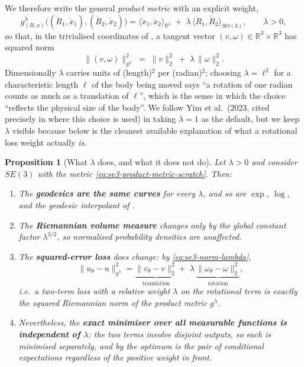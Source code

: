 \documentclass[11pt,a4paper]{report}
\newtheorem{proposition}[proposition]{Proposition}
\theoremstyle{definition}
\theoremstyle{remark}
\newcommand{\RR}{\mathbb R}
\begin{document}
We therefore write the general \emph{product metric} with an explicit
weight,
\begin{equation}
\label{eq:se3-product-metric-scratch}
g^\lambda_{(R,x)}\bigl((\dot R_1,\dot x_1),(\dot R_2,\dot x_2)\bigr)
=
\langle\dot x_1,\dot x_2\rangle_{\RR^3}
\;+\;
\lambda\,\langle\dot R_1,\dot R_2\rangle_{SO(3)} ,
\qquad \lambda>0 ,
\end{equation}
so that, in the trivialised coordinates of
, a tangent vector $(v,\omega)\in\RR^3\times\RR^3$
has squared norm
\begin{equation}
\label{eq:se3-norm-lambda}
\bigl\|(v,\omega)\bigr\|_{g^\lambda}^2 \;=\; \|v\|_2^2 \;+\; \lambda\,\|\omega\|_2^2 .
\end{equation}
Dimensionally $\lambda$ carries units of (length)$^2$ per (radian)$^2$;
choosing $\lambda=\ell^2$ for a characteristic length $\ell$ of the body
being moved says ``a rotation of one radian counts as much as a translation
of $\ell$'', which is the sense in which the choice ``reflects the physical
size of the body''. We follow Yim et al.\ (2023, cited precisely in
 where this choice is used) in taking $\lambda=1$ as
the default, but we keep $\lambda$ visible because
 below is the cleanest available explanation of
what a rotational loss weight actually \emph{is}.

\begin{proposition}[What $\lambda$ does, and what it does not do]
\label{prop:lambda-effect}
Let $\lambda>0$ and consider $SE(3)$ with the metric
\eqref{eq:se3-product-metric-scratch}. Then:
\begin{enumerate}[nosep,label=(\roman*)]
\item The \textbf{geodesics are the same curves} for every $\lambda$, and so
are $\exp$, $\log$, and the geodesic interpolant of
.
\item The \textbf{Riemannian volume measure} changes only by the global
constant factor $\lambda^{3/2}$, so normalised probability densities are
unaffected.
\item The \textbf{squared-error loss} does change: by
\eqref{eq:se3-norm-lambda},
\[
\bigl\|u_\theta-u\bigr\|^2_{g^\lambda}
=
\underbrace{\bigl\|v_\theta-v\bigr\|_2^2}_{\text{translation}}
+\;\lambda\,
\underbrace{\bigl\|\omega_\theta-\omega\bigr\|_2^2}_{\text{rotation}} ,
\]
i.e.\ \emph{a two-term loss with a relative weight $\lambda$ on the
rotational term is exactly the squared Riemannian norm of the product
metric $g^\lambda$}.
\item Nevertheless, the \textbf{exact minimiser over all measurable
functions is independent of $\lambda$}: the two terms involve disjoint
outputs, so each is minimised separately, and by 
the optimum is the pair of conditional expectations regardless of the
positive weight in front.
\end{enumerate}
\end{proposition}
\end{document}
